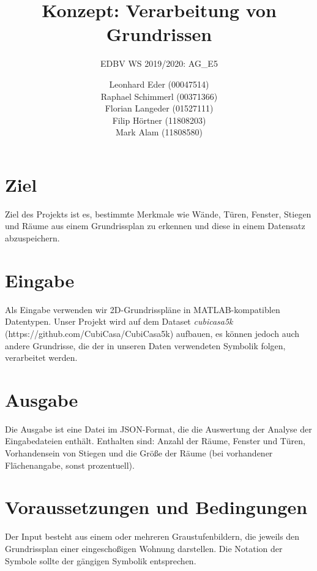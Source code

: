 \documentclass[deutsch]{scrartcl}
\begin{document}
\title{Konzept: Verarbeitung von Grundrissen} %

\subtitle{EDBV WS 2019/2020: AG\_E5} %


\author{Leonhard Eder (00047514)\\
Raphael Schimmerl (00371366)\\
Florian Langeder (01527111)\\
Filip Hörtner (11808203)\\
Mark Alam (11808580)}


\maketitle



\section{Ziel}
Ziel des Projekts ist es, bestimmte Merkmale wie Wände, Türen, Fenster, Stiegen und Räume aus einem Grundrissplan zu erkennen und diese in einem Datensatz abzuspeichern.
\section{Eingabe}
Als Eingabe verwenden wir 2D-Grundrisspläne in MATLAB-kompatiblen Datentypen. Unser Projekt wird auf dem Dataset \textit{cubicasa5k} (https://github.com/CubiCasa/CubiCasa5k) aufbauen, es können jedoch auch andere Grundrisse, die der in unseren Daten verwendeten Symbolik folgen, verarbeitet werden.
\section{Ausgabe}
Die Ausgabe ist eine Datei im JSON-Format, die die Auswertung der Analyse der Eingabedateien enthält. Enthalten sind: Anzahl der Räume, Fenster und Türen, Vorhandensein von Stiegen und die Größe der Räume (bei vorhandener Flächenangabe, sonst prozentuell).
\section{Voraussetzungen und Bedingungen}
Der Input besteht aus einem oder mehreren Graustufenbildern, die jeweils den Grundrissplan einer eingeschoßigen Wohnung darstellen. Die Notation der Symbole sollte der gängigen Symbolik entsprechen.
\end{document}
